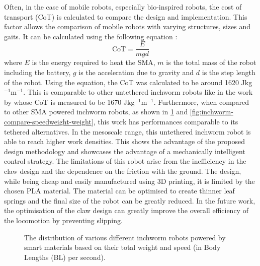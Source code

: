 Often, in the case of mobile robots, especially bio-inspired robots, the cost of transport (CoT) is calculated to compare the design and implementation. This factor allows the comparison of mobile robots with varying structures, sizes and gaits. It can be calculated using the following equation :
\begin{equation}\label{eq:CoT}
    \textrm{CoT} = \frac{E}{mgd}
\end{equation}
where $E$ is the energy required to heat the SMA, $m$ is the total mass of the robot including the battery, $g$ is the acceleration due to gravity and $d$ is the step length of the robot. Using the equation, the CoT was calculated to be around 1620 Jkg$^{-1}$m$^{-1}$. This is comparable to other untethered inchworm robots like in the work by \cite{jiAutonomousUntetheredFast2019} whose CoT is measured to be 1670 Jkg$^{-1}$m$^{-1}$. Furthermore, when compared to other SMA powered inchworm robots, as shown in \cref{fig:inchworm-compare-speed-weight} and \cref{fig:inchworm-compare-speedweight-weight}, this work has performances comparable to its tethered alternatives. In the mesoscale range, this untethered inchworm robot is able to reach higher work densities. This shows the advantage of the proposed design methodology and showcases the advantage of a mechanically intelligent control strategy. The limitations of this robot arise from the inefficiency in the claw design and the dependence on the friction with the ground. The design, while being cheap and easily manufactured using 3D printing, it is limited by the chosen PLA material. The material can be optimised to create thinner leaf springs and the final size of the robot can be greatly reduced. In the future work, the optimisation of the claw design can greatly improve the overall efficiency of the locomotion by preventing slipping.

\begin{figure}[hbt!] %
  \centering
  \resizebox{0.9\columnwidth}{!}{}
  \caption{The distribution of various different inchworm robots powered by smart materials based on their total weight and speed (in Body Lengths (BL) per second).}
  \label{fig:inchworm-compare-speed-weight}
\end{figure}

